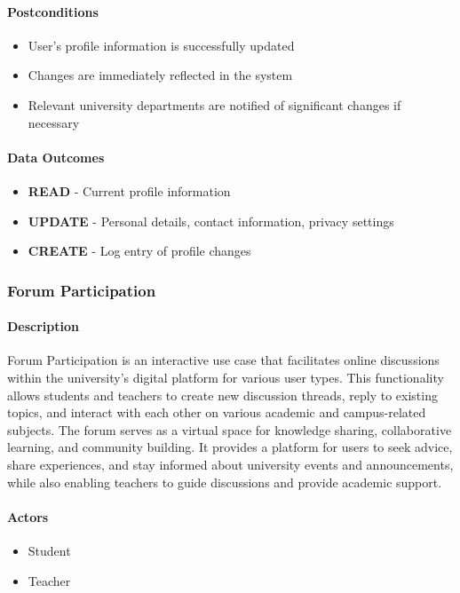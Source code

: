 \paragraph{Postconditions}
\begin{itemize}
    \item User's profile information is successfully updated
    \item Changes are immediately reflected in the system
    \item Relevant university departments are notified of significant changes if necessary
\end{itemize}

\paragraph{Data Outcomes}
\begin{itemize}
    \item \textbf{READ} - Current profile information
    \item \textbf{UPDATE} - Personal details, contact information, privacy settings
    \item \textbf{CREATE} - Log entry of profile changes
\end{itemize}

\subsubsection{Forum Participation}

\paragraph{Description}
Forum Participation is an interactive use case that facilitates online discussions within the university's digital platform for various user types. This functionality allows students and teachers to create new discussion threads, reply to existing topics, and interact with each other on various academic and campus-related subjects. The forum serves as a virtual space for knowledge sharing, collaborative learning, and community building. It provides a platform for users to seek advice, share experiences, and stay informed about university events and announcements, while also enabling teachers to guide discussions and provide academic support.

\paragraph{Actors}
\begin{itemize}
    \item Student
    \item Teacher
\end{itemize}

